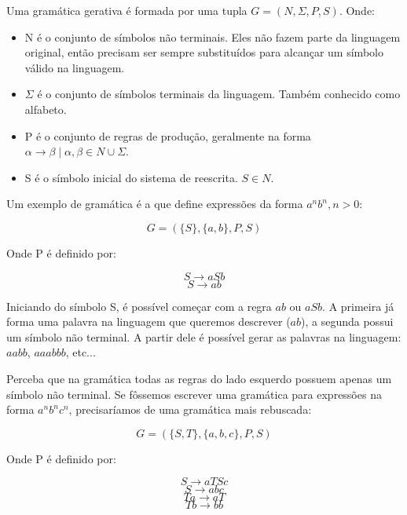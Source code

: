 \documentclass[a4paper,12pt,oneside,onecolumn]{uerj}
\begin{document}
Uma gramática gerativa é formada por uma tupla $G = (N, \Sigma, P, S)$. Onde:

\begin{itemize}
    \item N é o conjunto de símbolos não terminais. Eles não fazem parte da linguagem original, então precisam ser sempre substituídos para alcançar um símbolo válido na linguagem.
    \item $\Sigma$ é o conjunto de símbolos terminais da linguagem. Também conhecido como alfabeto.
    \item P é o conjunto de regras de produção, geralmente na forma $\alpha \rightarrow \beta \mid \alpha, \beta \in N \cup \Sigma$.
    \item S é o símbolo inicial do sistema de reescrita. $S \in N$.
\end{itemize}

Um exemplo de gramática é a que define expressões da forma $a^nb^n, n>0$:

\begin{equation*}
	G = ({\{S\}, \{a,b\}, P, S})
\end{equation*}

Onde P é definido por:

\begin{equation*}
	S \rightarrow aSb
\end{equation*}
\begin{equation*}
	S \rightarrow ab
\end{equation*}

Iniciando do símbolo S, é possível começar com a regra $ab$ ou $aSb$. A primeira já forma uma palavra na linguagem que queremos descrever ($ab$), a segunda possui um símbolo não terminal. A partir dele é possível gerar as palavras na linguagem: $aabb$, $aaabbb$, etc...

Perceba que na gramática todas as regras do lado esquerdo possuem apenas um símbolo não terminal. Se fôssemos escrever uma gramática para expressões na forma $a^nb^nc^n$, precisaríamos de uma gramática mais rebuscada:

\begin{equation*}
	G = (\{S, T\}, \{a,b,c\}, P, S)
\end{equation*}

Onde P é definido por:

\begin{equation*}
	S \rightarrow aTSc
\end{equation*}
\begin{equation*}
	S \rightarrow abc
\end{equation*}
\begin{equation*}
	Ta \rightarrow aT
\end{equation*}
\begin{equation*}
	Tb \rightarrow bb
\end{equation*}
\end{document}
